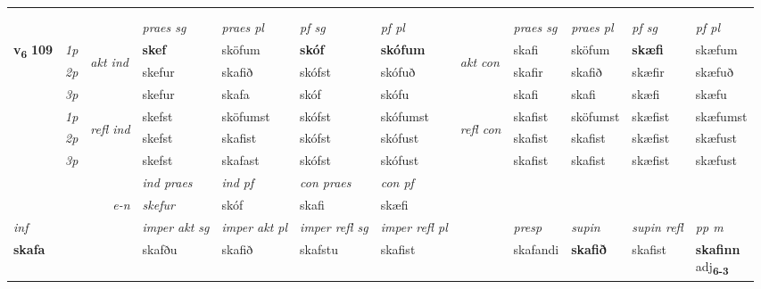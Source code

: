 \begin{longtable}[l]{X>{\footnotesize\itshape}llXXXXlXXXX}
\midrule
   & \\*
  & \\
   \midrule
 & &   & \textit{praes sg}  & \textit{praes pl}    & \textit{ pf sg} & \textit{pf pl} & & \textit{praes sg}  & \textit{praes pl}    & \textit{pf sg} & \textit{pf pl }  \\ \cmidrule{4-7} \cmidrule{9-12}
 \multirow{2}{*}{{{\textbf{v{\textsubscript{6}}} \Large{\textbf{109}}}}}  & 1p & \multirow{3}{*}{\begin{turn}{90}\textit{akt ind}\end{turn}} & \textbf{skef} & sköfum & \textbf{skóf} & \textbf{skófum} & \multirow{3}{*}{\begin{turn}{90}\textit{akt con}\end{turn}} &skafi & sköfum & \textbf{skæfi} & skæfum\\*
 & 2p &  &  skefur  & skafið & skófst & skófuð & & skafir & skafið & skæfir & skæfuð \\*
 & 3p &  & skefur & skafa & skóf & skófu & & skafi & skafi& skæfi & skæfu \\*
\cmidrule{4-7} \cmidrule{9-12}
 & 1p & \multirow{3}{*}{\begin{turn}{90}\textit{refl ind}\end{turn}}  & skefst & sköfumst & skófst & skófumst & \multirow{3}{*}{\begin{turn}{90}\textit{refl con}\end{turn}}  &skafist & sköfumst & skæfist & skæfumst \\*
 & 2p &  & skefst & skafist & skófst & skófust & &skafist & skafist & skæfist & skæfust \\*
 & 3p  & & skefst & skafast & skófst & skófust & & skafist & skafist& skæfist & skæfust \\*
\cmidrule{4-7} \cmidrule{9-12}

   && &  \textit{ind praes} & \textit{ind pf} & \textit{con praes} & \textit{con pf} \\*
\multicolumn{3}{r}{\textit{e-n}} & skefur & skóf & skafi & skæfi \\*

\cmidrule{4-7}
   {\textit{inf}} & &  & \textit{imper akt sg} & \textit{imper akt pl} & \textit{imper refl sg} & \textit{imper refl pl} && \textit{presp} & \textit{supin} & \textit{supin refl} & \textit{pp m} \\*
  {\textbf{skafa}} & && skafðu  & skafið & skafstu & skafist && skafandi &  \textbf{skafið} & skafist & \specialcell{\textbf{skafinn} \\ adj\textbf{\textsubscript{6-3}}} \\*


\end{longtable}
